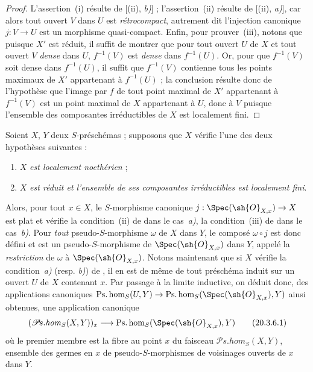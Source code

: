 \begin{proof}
L'assertion~(i) résulte de [(ii), \emph{b)}] ; l'assertion~(ii) résulte de [(ii), \emph{a)}], car alors tout ouvert $V$ dans $U$ est \emph{rétrocompact}, autrement dit l'injection canonique $j:V\to U$ est un morphisme quasi-compact.
Enfin, pour prouver~(iii), notons que puisque $X'$ est réduit, il suffit de montrer que pour tout ouvert $U$ de $X$ et tout ouvert $V$ \emph{dense} dans $U$, $f^{-1}(V)$ est \emph{dense} dans $f^{-1}(U)$.
Or, pour que $f^{-1}(V)$ soit dense dans $f^{-1}(U)$, il suffit que $f^{-1}(V)$ contienne tous les points maximaux de $X'$ appartenant à $f^{-1}(U)$ ; la conclusion résulte donc de l'hypothèse que l'image par $f$ de tout point
maximal de $X'$ appartenant à $f^{-1}(V)$ est un point maximal de $X$ appartenant à $U$, donc à $V$ puisque l'ensemble des composantes irréductibles de $X$ est localement fini.
\end{proof}

\begin{env}[20.3.6]
Soient $X$, $Y$ deux $S$-préschémas ; supposons que $X$ vérifie l'une des deux hypothèses suivantes :
\begin{enumerate}[label=\alph*)]
  \item $X$ \emph{est localement noethérien} ;
  \item $X$ \emph{est réduit et l'ensemble de ses composantes irréductibles est localement fini}.
\end{enumerate}

Alors, pour tout $x\in X$, le $S$-morphisme canonique $j:\Spec(\sh{O}_{X,x})\to X$ est plat et vérifie la condition~(ii) de  dans le cas~\emph{a)}, la condition~(iii) de  dans le cas~\emph{b)}.
Pour \emph{tout} pseudo-$S$-morphisme $\omega$ de $X$ dans $Y$, le composé $\omega\circ j$ est donc défini et est un pseudo-$S$-morphisme de $\Spec(\sh{O}_{X,x})$ dans $Y$, appelé la \emph{restriction} de $\omega$ à $\Spec(\sh{O}_{X,x})$.
Notons maintenant que si $X$ vérifie la condition~\emph{a)} (resp. \emph{b)}) de , il en est de même de tout préschéma induit sur un ouvert $U$ de $X$ contenant $x$.
Par passage à la limite inductive, on déduit donc, des applications canoniques $\operatorname{Ps.hom}_S(U,Y)\to\operatorname{Ps.hom}_S(\Spec(\sh{O}_{X,x}),Y)$ ainsi obtenues, une application canonique
\[
\label{IV.20.3.6.1}
  (\mathscr{P}\!s.\mathit{hom}_S(X,Y))_x\to\operatorname{Ps.hom}_S(\Spec(\sh{O}_{X,x}),Y)
  \tag{20.3.6.1}
\]
où le premier membre est la fibre au point $x$ du faisceau $\mathscr{P}\!s.\mathit{hom}_S(X,Y)$, ensemble des germes en $x$ de pseudo-$S$-morphismes de voisinages ouverts de $x$ dans $Y$.
\end{env}

